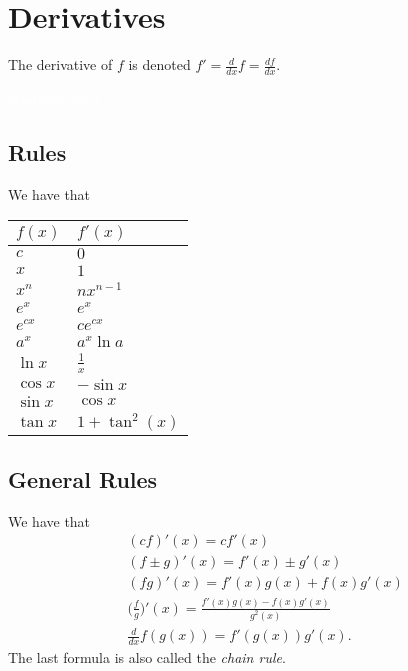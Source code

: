 \section{Derivatives}
The derivative of $f$ is denoted $f'=\frac{d}{dx}f=\frac{df}{dx}$.

\textcolor{white}{hemmelig tekst}

\subsection{Rules}
We have that
\begin{center}
		\begin{tabular}{@{}l l@{}}
		$f(x)$      & $f'(x)$  				\\ \toprule
		$c$			& $0$ 					\\ \midrule
		$x$			& $1$					\\ \midrule
		$x^n$  		& $nx^{n-1}$			\\ \midrule
		$e^x$  		& $e^x$					\\ \midrule
		$e^{cx}$  	& $ce^{cx}$				\\ \midrule
		$a^x$  		& $a^x\ln a $			\\ \midrule
		$\ln x$ 	& $\frac{1}{x}$			\\ \midrule
		$\cos x$  	& $-\sin x$				\\ \midrule
		$\sin x$  	& $\cos x$				\\ \midrule
		$\tan x$ 	& $1+\tan^2(x)$		\\ \bottomrule  
	\end{tabular}
\end{center}
\subsection{General Rules}
We have that
\begin{align*}
&(cf)'(x)=cf'(x)\\
&(f\pm g)'(x)=f'(x)\pm g'(x)\\
&(fg)'(x)=f'(x)g(x)+f(x)g'(x)\\
&\Big(\frac{f}{g}\Big)'(x)=\frac{f'(x)g(x)-f(x)g'(x)}{g^2(x)}\\
&\frac{d}{dx}f(g(x))=f'(g(x))g'(x).
\end{align*}
The last formula is also called the \emph{chain rule}.